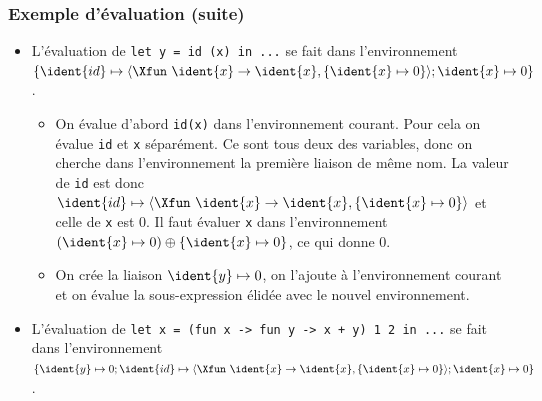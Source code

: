 %
\begin{frame}[containsverbatim]
\frametitle{Exemple d'évaluation (suite)}

\begin{itemize}

  \item L'évaluation de {\small \verb|let y = id (x) in ...|} se fait
    dans l'environnement $\{\ident{id} \mapsto \langle\Xfun \,\,
    \ident{x} \rightarrow \ident{x}, \{\ident{x} \mapsto 0\}\rangle;
    \ident{x} \mapsto 0\}$.
  \begin{itemize}

    \item On évalue d'abord \verb|id(x)| dans l'environnement
      courant. Pour cela on évalue \texttt{id} et \texttt{x}
      séparément. Ce sont tous deux des variables, donc on cherche
      dans l'environnement la première liaison de même nom. La valeur
      de \texttt{id} est donc $\ident{id} \mapsto \langle\Xfun \,\,
      \ident{x} \rightarrow \ident{x}, \{\ident{x} \mapsto 0\}\rangle$
      et celle de \texttt{x} est 0. Il faut évaluer \texttt{x} dans
      l'environnement $(\ident{x} \mapsto 0) \oplus \{\ident{x}
      \mapsto 0\}$, ce qui donne 0.

    \item On crée la liaison $\ident{y} \mapsto 0$, on l'ajoute à
    l'environnement courant et on évalue la sous-expression élidée
    avec le nouvel environnement.

  \end{itemize}

  \item L'évaluation de {\small
    \verb|let x = (fun x -> fun y -> x + y) 1 2 in ...|} se fait dans
    l'environnement $\{\ident{y} \mapsto 0; \ident{id} \mapsto
    \langle\Xfun \,\, \ident{x} \rightarrow \ident{x}, \{\ident{x}
    \mapsto 0\}\rangle; \ident{x} \mapsto 0\}$.

\end{itemize}

\end{frame}

